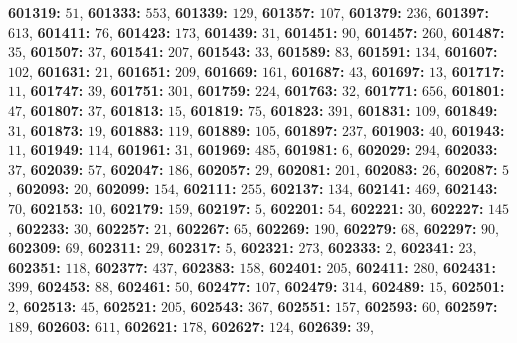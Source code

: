 \textsf{\bfseries 601319:} $51$, \textsf{\bfseries 601333:} $553$, \textsf{\bfseries 601339:} $129$, \textsf{\bfseries 601357:} $107$, \textsf{\bfseries 601379:} $236$, \textsf{\bfseries 601397:} $613$, \textsf{\bfseries 601411:} $76$, \textsf{\bfseries 601423:} $173$, \textsf{\bfseries 601439:} $31$, \textsf{\bfseries 601451:} $90$, \textsf{\bfseries 601457:} $260$, \textsf{\bfseries 601487:} $35$, \textsf{\bfseries 601507:} $37$, \textsf{\bfseries 601541:} $207$, \textsf{\bfseries 601543:} $33$, \textsf{\bfseries 601589:} $83$, \textsf{\bfseries 601591:} $134$, \textsf{\bfseries 601607:} $102$, \textsf{\bfseries 601631:} $21$, \textsf{\bfseries 601651:} $209$, \textsf{\bfseries 601669:} $161$, \textsf{\bfseries 601687:} $43$, \textsf{\bfseries 601697:} $13$, \textsf{\bfseries 601717:} $11$, \textsf{\bfseries 601747:} $39$, \textsf{\bfseries 601751:} $301$, \textsf{\bfseries 601759:} $224$, \textsf{\bfseries 601763:} $32$, \textsf{\bfseries 601771:} $656$, \textsf{\bfseries 601801:} $47$, \textsf{\bfseries 601807:} $37$, \textsf{\bfseries 601813:} $15$, \textsf{\bfseries 601819:} $75$, \textsf{\bfseries 601823:} $391$, \textsf{\bfseries 601831:} $109$, \textsf{\bfseries 601849:} $31$, \textsf{\bfseries 601873:} $19$, \textsf{\bfseries 601883:} $119$, \textsf{\bfseries 601889:} $105$, \textsf{\bfseries 601897:} $237$, \textsf{\bfseries 601903:} $40$, \textsf{\bfseries 601943:} $11$, \textsf{\bfseries 601949:} $114$, \textsf{\bfseries 601961:} $31$, \textsf{\bfseries 601969:} $485$, \textsf{\bfseries 601981:} $6$, \textsf{\bfseries 602029:} $294$, \textsf{\bfseries 602033:} $37$, \textsf{\bfseries 602039:} $57$, \textsf{\bfseries 602047:} $186$, \textsf{\bfseries 602057:} $29$, \textsf{\bfseries 602081:} $201$, \textsf{\bfseries 602083:} $26$, \textsf{\bfseries 602087:} $5$, \textsf{\bfseries 602093:} $20$, \textsf{\bfseries 602099:} $154$, \textsf{\bfseries 602111:} $255$, \textsf{\bfseries 602137:} $134$, \textsf{\bfseries 602141:} $469$, \textsf{\bfseries 602143:} $70$, \textsf{\bfseries 602153:} $10$, \textsf{\bfseries 602179:} $159$, \textsf{\bfseries 602197:} $5$, \textsf{\bfseries 602201:} $54$, \textsf{\bfseries 602221:} $30$, \textsf{\bfseries 602227:} $145$, \textsf{\bfseries 602233:} $30$, \textsf{\bfseries 602257:} $21$, \textsf{\bfseries 602267:} $65$, \textsf{\bfseries 602269:} $190$, \textsf{\bfseries 602279:} $68$, \textsf{\bfseries 602297:} $90$, \textsf{\bfseries 602309:} $69$, \textsf{\bfseries 602311:} $29$, \textsf{\bfseries 602317:} $5$, \textsf{\bfseries 602321:} $273$, \textsf{\bfseries 602333:} $2$, \textsf{\bfseries 602341:} $23$, \textsf{\bfseries 602351:} $118$, \textsf{\bfseries 602377:} $437$, \textsf{\bfseries 602383:} $158$, \textsf{\bfseries 602401:} $205$, \textsf{\bfseries 602411:} $280$, \textsf{\bfseries 602431:} $399$, \textsf{\bfseries 602453:} $88$, \textsf{\bfseries 602461:} $50$, \textsf{\bfseries 602477:} $107$, \textsf{\bfseries 602479:} $314$, \textsf{\bfseries 602489:} $15$, \textsf{\bfseries 602501:} $2$, \textsf{\bfseries 602513:} $45$, \textsf{\bfseries 602521:} $205$, \textsf{\bfseries 602543:} $367$, \textsf{\bfseries 602551:} $157$, \textsf{\bfseries 602593:} $60$, \textsf{\bfseries 602597:} $189$, \textsf{\bfseries 602603:} $611$, \textsf{\bfseries 602621:} $178$, \textsf{\bfseries 602627:} $124$, \textsf{\bfseries 602639:} $39$, 
